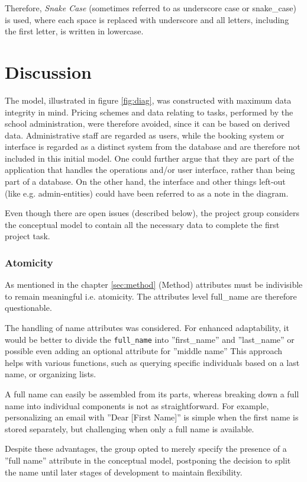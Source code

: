 \documentclass[a4paper]{scrartcl}
\begin{document}
Therefore, \emph{Snake Case}
(sometimes referred to as underscore case or 
 snake\_case)
is used, where each space is replaced with underscore
and all letters, including the first letter, is written in lowercase. 

\pagebreak
\section{Discussion}
The model, illustrated in figure \ref{fig:diag}, was constructed with maximum
data integrity in mind.
Pricing schemes and data relating to tasks, performed by the school
administration, were therefore avoided, since it can be based on derived data.
Administrative staff are regarded as users, while the booking system or
interface is regarded as a distinct system from the database and are therefore
not included in this initial model. One could further argue that they are part
of the application that handles the operations and/or user interface, rather
than being part of a database.  
On the other hand, the interface and other things left-out (like e.g.
admin-entities) could have been referred to as a note in the diagram.  

Even though there are open issues (described below), the project group considers
the conceptual model to contain all the necessary data to complete the first
project task.  

\subsubsection*{Atomicity}
As mentioned in the chapter \ref{sec:method} (Method) 
attributes must be indivisible to
remain meaningful i.e. atomicity.
The attributes
level
full_name
are therefore questionable.

The handling of name attributes was considered. 
For enhanced adaptability,  it
would be better to divide the 
\verb|full_name| into ''first_name'' and ''last_name'' or
possible even adding an optional attribute for ''middle name'' 
This approach helps with various functions, such as querying specific
individuals based on a last name, or organizing lists.

A full name can easily be assembled from its parts, 
whereas breaking down a full
name into individual components is not as straightforward. 
For example,
personalizing an email with ''Dear [First Name]'' 
is simple when the first name is
stored separately, but challenging when only a full name is available.

Despite these advantages, the group opted to merely specify the presence of a
''full name'' attribute in the conceptual model, postponing the decision to split
the name until later stages of development to maintain flexibility.
\end{document}
